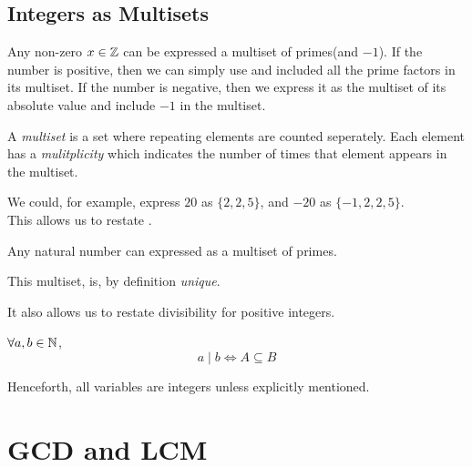 \subsection{Integers as Multisets}

\begin{claim}
    Any non-zero \(x \in \mathbb Z\) can be expressed a multiset of primes(and \(-1\)). If the number is positive, then we can simply use  and included all the prime factors in its multiset. If the number is negative, then we express it as the multiset of its absolute value and include \(-1\) in the multiset.
\end{claim}

\begin{remark}
    A \textit{multiset} is a set where repeating elements are counted seperately. Each element has a \textit{mulitplicity} which indicates the number of times that element appears in the multiset.
\end{remark}

We could, for example, express \(20\) as \(\{2, 2, 5\}\), and \(-20\) as \(\{-1, 2, 2, 5\}\).
\\
This allows us to restate .

\begin{theorem}
    Any natural number can expressed as a multiset of primes.
\end{theorem}

\begin{remark}
    This multiset, is, by definition \textit{unique}.
\end{remark}

It also allows us to restate divisibility for positive integers.

\begin{theorem}
    \(\forall a, b \in \mathbb N\), \[a \mid b \iff A \subseteq B \]
\end{theorem}


\begin{remark}
    Henceforth, all variables are integers unless explicitly mentioned.
\end{remark}

\section{GCD and LCM}

